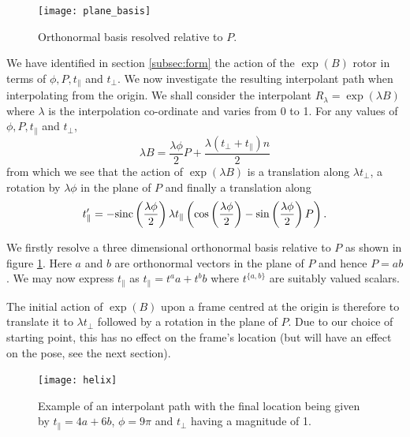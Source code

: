 \begin{figure}\centering
\texttt{[image: plane\_basis]}
\caption{\label{fig:plane_basis}Orthonormal basis resolved relative to $P$.}
\end{figure}

We have identified in section \ref{subsec:form} the action of the $\exp(B)$
rotor in terms of $\phi, P, t_\parallel$ and $t_\perp$. We now investigate the resulting interpolant
path when interpolating from the origin. We shall consider the interpolant
$R_\lambda = \exp(\lambda B)$ where $\lambda$ is the interpolation co-ordinate and
varies from 0 to 1. For any values of $\phi, P, t_\parallel$ and $t_\perp$,
\[
\lambda B = \frac{\lambda \phi}{2} P + \frac{\lambda (t_\perp + t_\parallel) n}{2}
\]
from which we see that the action of $\exp(\lambda B)$ is a translation along $\lambda t_\perp$, a rotation by
$\lambda \phi$ in the plane of $P$ and finally a translation along
\[
t'_\parallel =- \mathrm{sinc}\left(\frac{\lambda\phi}{2}\right)
\lambda t_\parallel
\left(
\cos\left(\frac{\lambda \phi}{2}\right) -
\sin\left(\frac{\lambda \phi}{2}\right) P 
\right).
\]

We firstly resolve a three dimensional orthonormal basis relative to $P$ as shown in figure 
\ref{fig:plane_basis}. Here $a$ and $b$ are orthonormal vectors in the plane of $P$ and hence
$P = ab$. We may now express $t_\parallel$ as $t_\parallel = t^a a + t^b b$ where $t^{\{a,b\}}$ are suitably
valued scalars.

The initial action of $\exp(B)$ upon a frame centred at the origin is therefore to 
translate it to $\lambda t_\perp$ followed by a rotation in the plane of $P$. Due to our choice of starting
point, this has no effect on the frame's location (but will have an effect on the pose, 
see the next section).


\begin{figure}\centering
\texttt{[image: helix]}
\caption{\label{fig:helix} Example of an interpolant path with the final location being given by
$t_\parallel = 4a + 6b$, $\phi = 9\pi$ and $t_\perp$ having a magnitude of 1.}
\end{figure}

